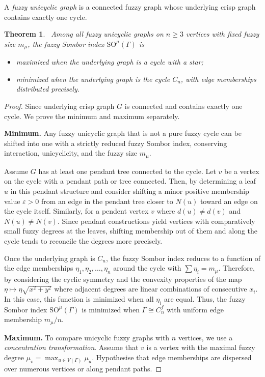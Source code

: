 \documentclass[12pt]{amsart}
\newtheorem{theorem}{Theorem}[section]
\newcommand{\SOG}{\mathrm{SO}^{\mu}}
\begin{document}
A \emph{fuzzy unicyclic graph} is a connected fuzzy graph whose underlying crisp graph contains exactly one cycle.

\begin{theorem}~\label{Thmfuzzytree02}
Among all fuzzy unicyclic graphs on $n \geq 3$ vertices with fixed fuzzy size $m_{\mu}$, the fuzzy Sombor index $\SOG(\Gamma)$ is
\begin{itemize}
    \item maximized when the underlying graph is a cycle with a star; 
    \item minimized when the underlying graph is the cycle $C_n$, with edge memberships distributed precisely.
\end{itemize}
\end{theorem}
\begin{proof}
Since underlying crisp graph $G$ is connected and contains exactly one cycle. We prove the minimum and maximum separately.

\medskip

 \textbf{Minimum.} Any fuzzy unicyclic graph that is not a pure fuzzy cycle can be shifted into one with a strictly reduced fuzzy Sombor index, conserving interaction, unicyclicity, and the fuzzy size $m_{\mu}$.
 
Assume $G$ has at least one pendant tree connected to the cycle. Let $v$ be a vertex on the cycle with a pendant path or tree connected. Then, by determining a leaf $u$ in this pendant structure and consider shifting a minor positive membership value $\varepsilon > 0$ from an edge in the pendant tree closer to $N(u)$ toward an edge on the cycle itself. Similarly, for a pendent vertex $v$ where $d(u)\neq d(v)$ and $N(u)\neq N(v)$. Since pendant constructions yield vertices with comparatively small fuzzy degrees at the leaves, shifting membership out of them and along the cycle tends to reconcile the degrees more precisely. 

Once the underlying graph is $C_n$, the fuzzy Sombor index reduces to a function of the edge memberships $\eta_1, \eta_2, \dots, \eta_n$ around the cycle with $\sum \eta_i=m_{\mu}$. Therefore, by considering the cyclic symmetry and the convexity properties of the map $\eta \mapsto \eta \sqrt{x^2+y^2}$ where adjacent degrees are linear combinations of consecutive $x_i$. In this case, this function is minimized when all $\eta_i$ are equal. 
Thus, the fuzzy Sombor index $\SOG(\Gamma)$ is minimized when $\Gamma\cong C_n^f$ with uniform edge membership $m_{\mu}/n$.


\textbf{Maximum.} To compare unicyclic fuzzy graphs with $n$ vertices, we use a \emph{concentration transformation}. Assume that $v$ is a vertex with the maximal fuzzy degree $\mu_v = \max_{u \in V(\Gamma)} \mu_u.$
Hypothesise that edge memberships are dispersed over numerous vertices or along pendant paths.


\end{proof}
\end{document}
